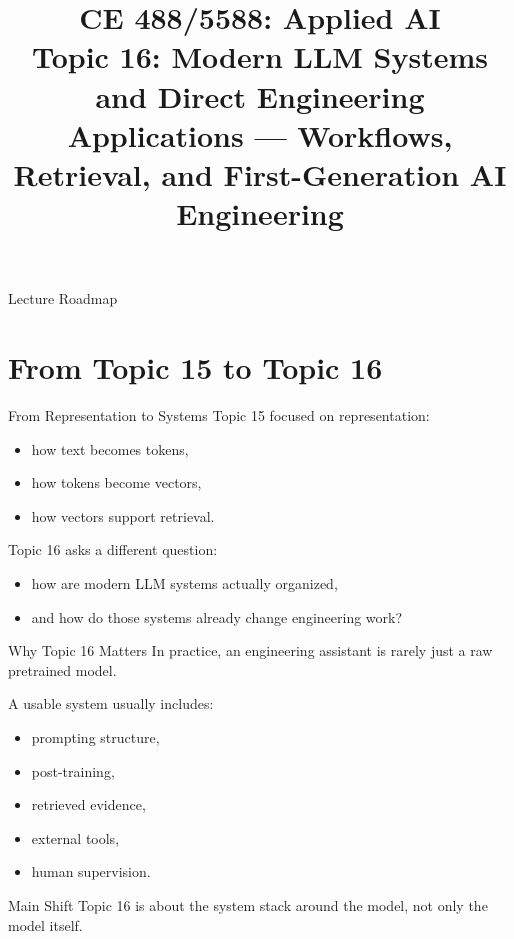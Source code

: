 \documentclass[12pt]{beamer}
\title[Topic 16: Modern LLM Systems]{CE 488/5588: Applied AI\\Topic 16: Modern LLM Systems and Direct Engineering Applications --- Workflows, Retrieval, and First-Generation AI Engineering}
\author{}
\date{}
\begin{document}
\begin{frame}
  \titlepage
\end{frame}

\begin{frame}{Lecture Roadmap}
  \tableofcontents
\end{frame}

\section{From Topic 15 to Topic 16}

\begin{frame}{From Representation to Systems}
  Topic 15 focused on representation:
  \begin{itemize}
    \item how text becomes tokens,
    \item how tokens become vectors,
    \item how vectors support retrieval.
  \end{itemize}

  Topic 16 asks a different question:
  \begin{itemize}
    \item how are modern LLM systems actually organized,
    \item and how do those systems already change engineering work?
  \end{itemize}
\end{frame}

\begin{frame}{Why Topic 16 Matters}
  In practice, an engineering assistant is rarely just a raw pretrained model.

  A usable system usually includes:
  \begin{itemize}
    \item prompting structure,
    \item post-training,
    \item retrieved evidence,
    \item external tools,
    \item human supervision.
  \end{itemize}

  \begin{conceptbox}{Main Shift}
    Topic 16 is about the system stack around the model, not only the model itself.
  \end{conceptbox}
\end{frame}
\end{document}
